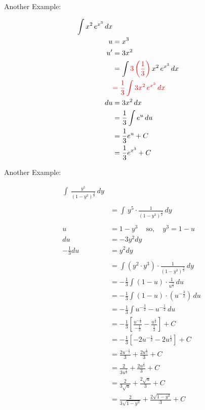 \noindent Another Example:

\begin{framed}
\begin{align*}
  \int x^2 \, e^{x^3} \, dx\\
  u &= x^3\\
  u' &= 3x^2\\
  &= \int \textcolor{red}{3\left(\frac{1}{3}\right)} \, x^2 \, e^{x^3} \, dx\\
  &\textcolor{red}{= \frac{1}{3} \int 3x^2 \, e^{x^3} \, dx}\\
  du &= 3x^2 \, dx\\
  &= \frac{1}{3} \int e^u \, du\\
  &= \frac{1}{3} e^u + C\\
  &= \frac{1}{3} e^{x^3} + C
\end{align*}
\end{framed}

\noindent Another Example:

\begin{framed}
\begin{align*}
  \int  \, \frac{y^5}{(1-y^3)^{\frac{3}{2}}} \, dy\\\\
  &= \int \, y^5 \cdot \frac{1}{(1-y^3)^{\frac{3}{2}}} \, dy\\\\
  u &= 1-y^3 \; \; \; \text{  so, }  \; \; \; y^3 = 1-u\\
  du &= -3y^2dy\\
  -\frac{1}{3}du &= y^2dy\\\\
  &= \int \left(y^2 \cdot y^3\right) \cdot \frac{1}{(1-y^3)^{\frac{3}{2}}} \, dy\\
  &= -\frac{1}{3} \int (1-u) \cdot \frac{1}{u^{\frac{3}{2}}} \, du\\
  &= -\frac{1}{3} \int (1-u) \cdot \left(u^{-\frac{3}{2}}\right) \, du\\
  &= -\frac{1}{3} \int u^{-\frac{3}{2}} - u^{-\frac{1}{2}} \, du\\
  &= -\frac{1}{3} \left[\frac{u^{-\frac{1}{2}}}{-\frac{1}{2}} 
  - \frac{u^{\frac{1}{2}}}{\frac{1}{2}}\right] + C\\
  &= -\frac{1}{3} \left[-2u^{-\frac{1}{2}} - 2u^{\frac{1}{2}}\right] + C\\
  &= \frac{2u^{-\frac{1}{2}}}{3} + \frac{2u^{\frac{1}{2}}}{3} + C\\
  &= \frac{2}{3u^{\frac{1}{2}}} + \frac{2u^{\frac{1}{2}}}{3} + C\\
  &= \frac{2}{3\sqrt{u}} + \frac{2\sqrt{u}}{3} + C\\
  &= \frac{2}{3\sqrt{1-y^3}} + \frac{2\sqrt{1-y^3}}{3} + C
\end{align*}
\end{framed}

